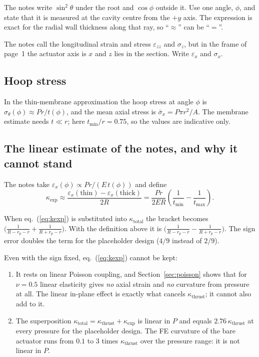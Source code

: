 \documentclass[11pt,a4paper]{article}
\numberwithin{equation}{section}
\newcommand{\rp}{r_p}
\newcommand{\tmin}{t_{\min}}
\newcommand{\tmax}{t_{\max}}
\begin{document}
\begin{correction}
The notes write $\sin^2\theta$ under the root and $\cos\phi$ outside it. Use one angle, $\phi$, and state that it is measured at the
cavity centre from the $+y$ axis. The expression is exact for the radial wall thickness along that ray, so ``$\approx$'' can be ``$=$''.
\end{correction}

\begin{correction}
The notes call the longitudinal strain and stress $\varepsilon_{zz}$ and $\sigma_z$, but in the frame of page~1 the actuator axis is $x$ and $z$ lies in the section.
Write $\varepsilon_x$ and $\sigma_x$.
\end{correction}

\subsection{Hoop stress}
In the thin-membrane approximation the hoop stress at angle $\phi$ is $\sigma_\theta(\phi)\approx P r/t(\phi)$, and the mean axial stress is
$\bar\sigma_x = P\pi r^2/A$. The membrane estimate needs $t\ll r$; here $\tmin/r = 0.75$, so the values are indicative only.

\subsection{The linear estimate of the notes, and why it cannot stand}
The notes take $\varepsilon_x(\phi)\propto Pr/(E\,t(\phi))$ and define
\begin{equation}
\kappa_{\exp} \approx \frac{\varepsilon_x(\text{thin})-\varepsilon_x(\text{thick})}{2R} = \frac{P r}{2ER}\left(\frac{1}{\tmin}-\frac{1}{\tmax}\right). \label{eq:kexp}
\end{equation}

\begin{correction}
When eq.~(\ref{eq:kexp}) is substituted into $\kappa_{\text{total}}$ the bracket becomes $\big(\frac{1}{R-\rp-r}+\frac{1}{R+\rp-r}\big)$. With the definition above it is
$\big(\frac{1}{R-\rp-r}-\frac{1}{R+\rp-r}\big)$. The sign error doubles the term for the placeholder design ($4/9$ instead of $2/9$).
\end{correction}

Even with the sign fixed, eq.~(\ref{eq:kexp}) cannot be kept:
\begin{enumerate}[nosep]
\item It rests on linear Poisson coupling, and Section~\ref{sec:poisson} shows that for $\nu=0.5$ linear elasticity gives \emph{no} axial strain and \emph{no} curvature from pressure at all.
The linear in-plane effect is exactly what cancels $\kappa_{\text{thrust}}$; it cannot also add to it.
\item The superposition $\kappa_{\text{total}}=\kappa_{\text{thrust}}+\kappa_{\exp}$ is linear in $P$ and equals $2.76\,\kappa_{\text{thrust}}$ at every pressure for the placeholder design.
The FE curvature of the bare actuator runs from $0.1$ to $3$ times $\kappa_{\text{thrust}}$ over the pressure range: it is not linear in $P$.
\end{enumerate}
\end{document}
